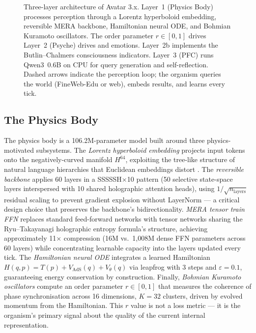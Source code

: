 \documentclass[12pt,a4paper]{article}
\begin{document}
\begin{figure}[H]
\caption{Three-layer architecture of Avatar 3.x. Layer~1 (Physics Body) processes
perception through a Lorentz hyperboloid embedding, reversible MERA backbone, Hamiltonian
neural ODE, and Bohmian Kuramoto oscillators. The order parameter $r \in [0,1]$ drives
Layer~2 (Psyche) drives and emotions. Layer~2b implements the Butlin--Chalmers consciousness
indicators. Layer~3 (PFC) runs Qwen3~0.6B on CPU for query generation and self-reflection.
Dashed arrows indicate the perception loop; the organism queries the world (FineWeb-Edu
or web), embeds results, and learns every tick.}
\label{fig:arch}
\end{figure}

\subsection{The Physics Body}

The physics body is a 106.2M-parameter model built around three physics-motivated
subsystems. The \emph{Lorentz hyperboloid embedding} projects input tokens onto the
negatively-curved manifold $H^{64}$, exploiting the tree-like structure of natural
language hierarchies that Euclidean embeddings distort \cite{graves2016hybrid}. The
\emph{reversible backbone} applies 60 layers in a SSSSSH$\times$10 pattern (50 selective
state-space layers interspersed with 10 shared holographic attention heads), using
$1/\sqrt{n_{\text{layers}}}$ residual scaling to prevent gradient explosion without
LayerNorm --- a critical design choice that preserves the backbone's bidirectionality.
\emph{MERA tensor train FFN} replaces standard feed-forward networks with tensor networks
sharing the Ryu--Takayanagi holographic entropy formula's structure, achieving
approximately 11$\times$ compression (16M vs.\ 1{,}008M dense FFN parameters across 60
layers) while concentrating learnable capacity into the layers updated every tick. The
\emph{Hamiltonian neural ODE} integrates a learned Hamiltonian $H(q,p) = T(p) + V_{\text{AdS}}(q) + V_\theta(q)$ via leapfrog with 3 steps and $\varepsilon=0.1$,
guaranteeing energy conservation by construction. Finally, \emph{Bohmian Kuramoto
oscillators} compute an order parameter $r \in [0,1]$ that measures the coherence of
phase synchronisation across 16 dimensions, $K=32$ clusters, driven by evolved momentum
from the Hamiltonian. This $r$ value is not a loss metric --- it is the organism's
primary signal about the quality of the current internal representation.
\end{document}
